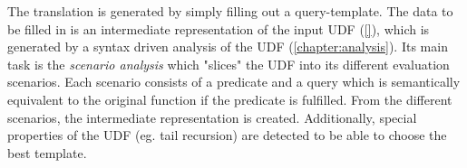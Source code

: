 The translation is generated by simply filling out a query-template. The data to be filled in is an intermediate representation of the input UDF (\autoref{}), which is generated by a syntax driven analysis of the UDF (\autoref{chapter:analysis}). Its main task is the \textit{scenario analysis} which "slices" the UDF into its different evaluation scenarios. Each scenario consists of a predicate and a query which is semantically equivalent to the original function if the predicate is fulfilled. From the different scenarios, the intermediate representation is created. Additionally, special properties of the UDF (eg. tail recursion) are detected to be able to choose the best template.

\iffalse
\begin{tikzpicture}[->, level distance=15mm, align=center]
\tikzstyle{level 1}=[sibling distance=85mm]
\tikzstyle{level 2}=[sibling distance=40mm]
\tikzstyle{level 3}=[sibling distance=40mm]
\node{fib(4)\\\scriptsize{initial call}}
  child { node {fib(3)\\\scriptsize{(in\_arg: 4, callsite: 1, call\_arg: 3)}}
    child {node (fib2) {fib(2)\\\tiny{(in\_arg: 3, callsite: 1, call\_arg: 2)}}
    }
    child {node (fib1) {fib(1)\\\tiny{(in\_arg: 3, callsite: 2, call\_arg: 1)}} }
  }
  child {node {fib(2)\\\scriptsize{(in\_arg: 4, callsite: 2, call\_arg: 2)}}
    child {node (fib1) {fib(1)\\\tiny{(in\_arg: 2, callsite: 1, call\_arg: 1)}} }
    child {node (fib0) {fib(0)\\\tiny{(in\_arg: 2, callsite: 2, call\_arg: 0)}} }
  };
\draw[->, bend left=10, out=225, in=225, looseness=0.5] (fib2) edge (fib1);
\draw[->, bend right=5, out=305, in=225, looseness=0.5] (fib2) edge (fib0);
\end{tikzpicture}
\fi

  
